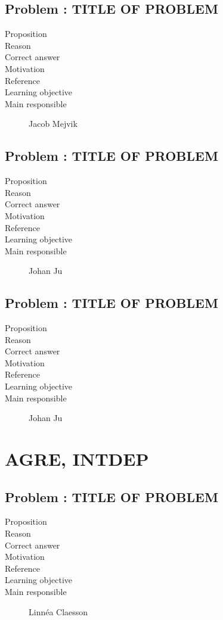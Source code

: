 \documentclass[10pt,a4paper]{article}
\begin{document}
\subsection*{Problem : TITLE OF PROBLEM}
\begin{description}
\item[Proposition] 
\item[Reason] 
\item[Correct answer]
\item[Motivation]
\item[Reference]
\item[Learning objective]
\item[Main responsible] Jacob Mejvik
\end{description}

\subsection*{Problem : TITLE OF PROBLEM}
\begin{description}
\item[Proposition] 
\item[Reason] 
\item[Correct answer]
\item[Motivation]
\item[Reference]
\item[Learning objective]
\item[Main responsible] Johan Ju
\end{description}

\subsection*{Problem : TITLE OF PROBLEM}
\begin{description}
\item[Proposition] 
\item[Reason] 
\item[Correct answer]
\item[Motivation]
\item[Reference]
\item[Learning objective]
\item[Main responsible] Johan Ju
\end{description}


\section*{AGRE, INTDEP}
\subsection*{Problem : TITLE OF PROBLEM}
\begin{description}
\item[Proposition] 
\item[Reason] 
\item[Correct answer]
\item[Motivation]
\item[Reference]
\item[Learning objective]
\item[Main responsible] Linn\'ea Claesson
\end{description}
\end{document}

